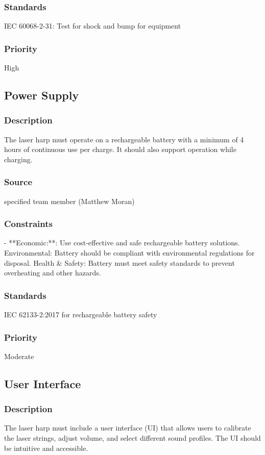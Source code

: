 \subsubsection{Standards}
IEC 60068-2-31: Test for shock and bump for equipment
\subsubsection{Priority}
High


\subsection{Power Supply}
\subsubsection{Description}
The laser harp must operate on a rechargeable battery with a minimum of 4 hours of continuous use per charge. It should also support operation while charging.
\subsubsection{Source}
specified team member (Matthew Moran)
\subsubsection{Constraints}
- **Economic:**: Use cost-effective and safe rechargeable battery solutions.
Environmental: Battery should be compliant with environmental regulations for disposal.
Health & Safety: Battery must meet safety standards to prevent overheating and other hazards.
\subsubsection{Standards}
IEC 62133-2:2017 for rechargeable battery safety
\subsubsection{Priority}
Moderate


\subsection{User Interface}
\subsubsection{Description}
The laser harp must include a user interface (UI) that allows users to calibrate the laser strings, adjust volume, and select different sound profiles. The UI should be intuitive and accessible.
